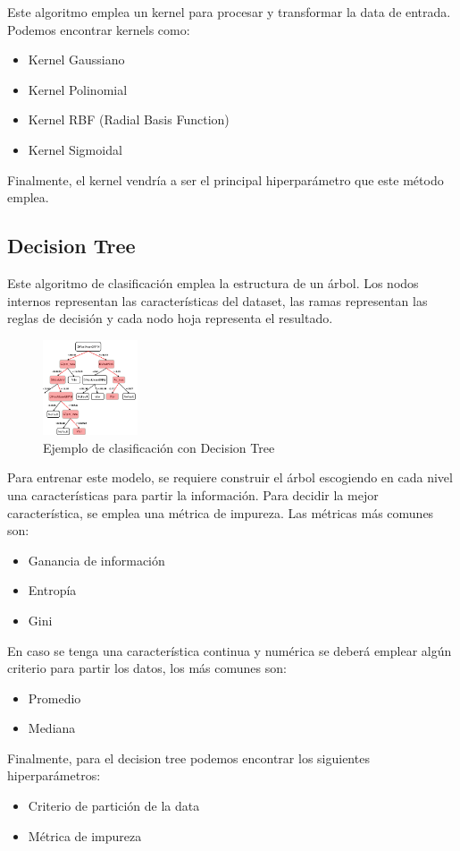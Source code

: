 \documentclass[conference]{IEEEtran}
\begin{document}
Este algoritmo emplea un kernel para procesar y transformar la data de entrada. Podemos encontrar kernels como:
\begin{itemize}
    \item Kernel Gaussiano
    \item Kernel Polinomial
    \item Kernel RBF (Radial Basis Function)
    \item Kernel Sigmoidal
\end{itemize}
Finalmente, el kernel vendría a ser el principal hiperparámetro que este método emplea.

\subsection{Decision Tree}
Este algoritmo de clasificación emplea la estructura de un árbol. Los nodos internos
representan las características del dataset, las ramas representan las reglas de decisión y cada nodo hoja representa el resultado.
\begin{figure}[ht]
    \centering
    \includegraphics[width=0.25\textwidth]{images/dstree.png}
    \caption{Ejemplo de clasificación con Decision Tree}
    \label{fig:dstree}
\end{figure}
Para entrenar este modelo, se requiere construir el árbol escogiendo en cada nivel una características para partir la información.
Para decidir la mejor característica, se emplea una métrica de impureza. Las métricas más comunes son:
\begin{itemize}
    \item Ganancia de información
    \item Entropía
    \item Gini
\end{itemize}
En caso se tenga una característica continua y numérica se deberá emplear algún criterio para partir los datos, los más comunes son:
\begin{itemize}
    \item Promedio
    \item Mediana
\end{itemize}
Finalmente, para el decision tree podemos encontrar los siguientes hiperparámetros:
\begin{itemize}
    \item Criterio de partición de la data
    \item Métrica de impureza
\end{itemize}
\end{document}
